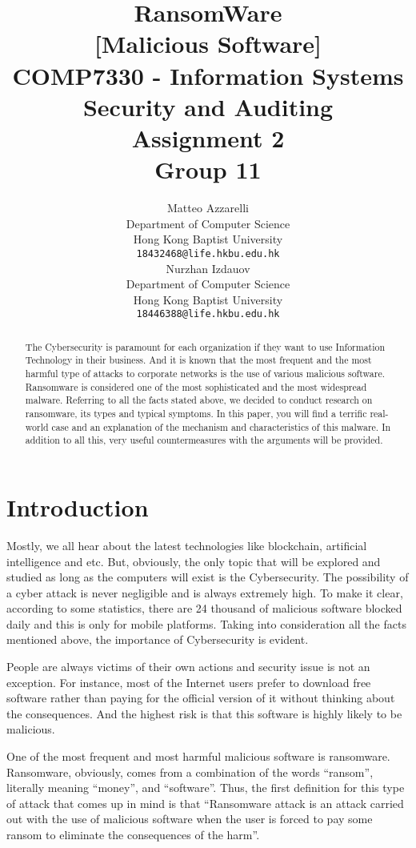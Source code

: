 \documentclass{article}
\title{RansomWare\\\large{[Malicious Software]}\\ \normalsize{COMP7330 - Information Systems Security and Auditing\\Assignment 2\\Group 11}}
\author{
  Matteo Azzarelli\\
  Department of Computer Science\\
  Hong Kong Baptist University\\
  \texttt{18432468@life.hkbu.edu.hk} \\
  \And
  Nurzhan Izdauov\\
  Department of Computer Science\\
  Hong Kong Baptist University\\
  \texttt{18446388@life.hkbu.edu.hk} \\
}
\begin{document}
\maketitle

\begin{abstract}
    The Cybersecurity is paramount for each organization if they want to use Information Technology in their business. And it is known that the most frequent and the most harmful type of attacks to corporate networks is the use of various malicious software. Ransomware is considered one of the most sophisticated and the most widespread malware. Referring to all the facts stated above, we decided to conduct research on ransomware, its types and typical symptoms. In this paper, you will find a terrific real-world case and an explanation of the mechanism and characteristics of this malware. In addition to all this, very useful countermeasures with the arguments will be provided.
\end{abstract}




\section{Introduction}
    Mostly, we all hear about the latest technologies like blockchain, artificial intelligence and etc. But, obviously, the only topic that will be explored and studied as long as the computers will exist is the Cybersecurity. The possibility of a cyber attack is never negligible and is always extremely high. To make it clear, according to some statistics, there are 24 thousand of malicious software blocked daily and this is only for mobile platforms.\cite{cit1} Taking into consideration all the facts mentioned above, the importance of Cybersecurity is evident.
    
	People are always victims of their own actions and security issue is not an exception. For instance, most of the Internet users prefer to download free software rather than paying for the official version of it without thinking about the consequences. And the highest risk is that this software is highly likely to be malicious.
	
	One of the most frequent and most harmful malicious software is ransomware. Ransomware, obviously, comes from a combination of the words “ransom”, literally meaning “money”, and “software”. Thus, the first definition for this type of attack that comes up in mind is that “Ransomware attack is an attack carried out with the use of malicious software when the user is forced to pay some ransom to eliminate the consequences of the harm”.
	
\end{document}

